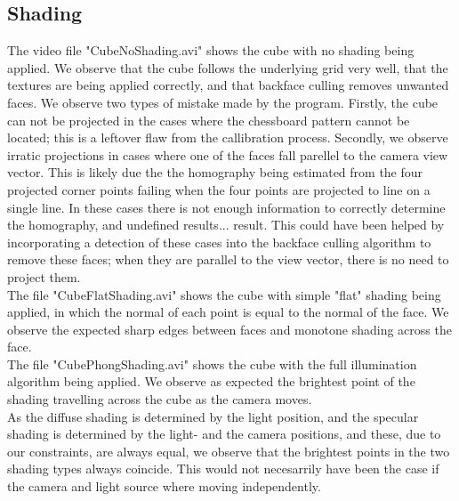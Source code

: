 \subsection{Shading}
The video file "CubeNoShading.avi" shows the cube with no shading being applied. We observe that the cube follows the underlying grid very well, that the textures are being applied correctly, and that backface culling removes unwanted faces. We observe two types of mistake made by the program. Firstly, the cube can not be projected in the cases where the chessboard pattern cannot be located; this is a leftover flaw from the callibration process. Secondly, we observe irratic projections in cases where one of the faces fall parellel to the camera view vector. This is likely due the the homography being estimated from the four projected corner points failing when the four points are projected to line on a single line. In these cases there is not enough information to correctly determine the homography, and undefined results... result. This could have been helped by incorporating a detection of these cases into the backface culling algorithm to remove these faces; when they are parallel to the view vector, there is no need to project them.\\
The file "CubeFlatShading.avi" shows the cube with simple "flat" shading being applied, in which the normal of each point is equal to the normal of the face. We observe the expected sharp edges between faces and monotone shading across the face.\\
The file "CubePhongShading.avi" shows the cube with the full illumination algorithm being applied. We observe as expected the brightest point of the shading travelling across the cube as the camera moves.\\
As the diffuse shading is determined by the light position, and the specular shading is determined by the light- and the camera positions, and these, due to our constraints, are always equal, we observe that the brightest points in the two shading types always coincide. This would not necesarrily have been the case if the camera and light source where moving independently.
